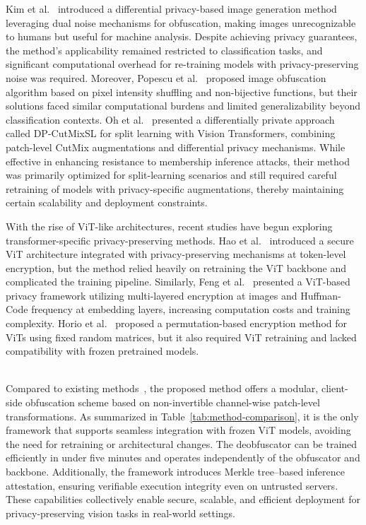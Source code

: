 \documentclass{ieeeaccess}
\begin{document}
Kim et al.~\cite{s24103166} introduced a differential privacy-based image generation method leveraging dual noise mechanisms for obfuscation, making images unrecognizable to humans but useful for machine analysis. Despite achieving privacy guarantees, the method's applicability remained restricted to classification tasks, and significant computational overhead for re-training models with privacy-preserving noise was required. Moreover, Popescu et al.~\cite{9786187} proposed image obfuscation algorithm based on pixel intensity shuffling and non-bijective functions, but their solutions faced similar computational burdens and limited generalizability beyond classification contexts. Oh et al.~\cite{oh2022differentially} presented a differentially private approach called DP-CutMixSL for split learning with Vision Transformers, combining patch-level CutMix augmentations and differential privacy mechanisms. While effective in enhancing resistance to membership inference attacks, their method was primarily optimized for split-learning scenarios and still required careful retraining of models with privacy-specific augmentations, thereby maintaining certain scalability and deployment constraints.

With the rise of ViT-like architectures, recent studies have begun exploring transformer-specific privacy-preserving methods. Hao et al.~\cite{hao2023privacypreserving} introduced a secure ViT architecture integrated with privacy-preserving mechanisms at token-level encryption, but the method relied heavily on retraining the ViT backbone and complicated the training pipeline. Similarly, Feng et al.~\cite{10445482} presented a ViT-based privacy framework utilizing multi-layered encryption at images and Huffman-Code frequency at embedding layers, increasing computation costs and training complexity. Horio et al.~\cite{horio2024privacypreservingvisiontransformerusing} proposed a permutation-based encryption method for ViTs using fixed random matrices, but it also required ViT retraining and lacked compatibility with frozen pretrained models.





\\

Compared to existing methods~\cite{hao2023privacypreserving,10445482,horio2024privacypreservingvisiontransformerusing}, the proposed method offers a modular, client-side obfuscation scheme based on non-invertible channel-wise patch-level transformations. As summarized in Table~\ref{tab:method-comparison}, it is the only framework that supports seamless integration with frozen ViT models, avoiding the need for retraining or architectural changes. The deobfuscator can be trained efficiently in under five minutes and operates independently of the obfuscator and backbone. Additionally, the framework introduces Merkle tree–based inference attestation, ensuring verifiable execution integrity even on untrusted servers. These capabilities collectively enable secure, scalable, and efficient deployment for privacy-preserving vision tasks in real-world settings.
\end{document}
